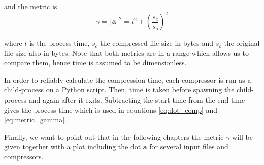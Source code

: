and the metric is
\begin{equation} \label{eq:metric_gamma}
\gamma = \left\Vert \mathbf{a} \right\Vert ^2 = t^2 + \left(\frac{s_c}{s_o}\right)^2
\end{equation}

where $t$ is the process time, $s_c$ the compressed file size in bytes and $s_o$ the original file size also in bytes. Note that both metrics are in a range which allows us to compare them, hence time is assumed to be dimensionless.

In order to reliably calculate the compression time, each compressor is run as a child-process on a Python script. Then, time is taken before spawning the child-process and again after it exits. Subtracting the start time from the end time gives the process time which is used in equations \ref{eq:dot_comp} and \ref{eq:metric_gamma}.

Finally, we want to point out that in the following chapters the metric $\gamma$ will be given together with a plot including the dot $\mathbf{a}$ for several input files and compressors.

